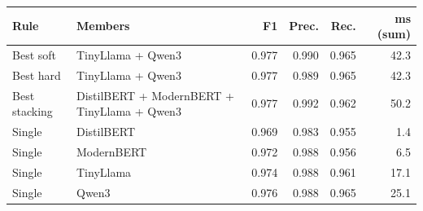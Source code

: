 \begin{tabular}{llrrrr}
\toprule
Rule & Members & F1 & Prec. & Rec. & ms (sum) \\
\midrule
Best soft & TinyLlama + Qwen3 & 0.977 & 0.990 & 0.965 & 42.3 \\
Best hard & TinyLlama + Qwen3 & 0.977 & 0.989 & 0.965 & 42.3 \\
Best stacking & DistilBERT + ModernBERT + TinyLlama + Qwen3 & 0.977 & 0.992 & 0.962 & 50.2 \\
\midrule Single & DistilBERT & 0.969 & 0.983 & 0.955 & 1.4 \\
Single & ModernBERT & 0.972 & 0.988 & 0.956 & 6.5 \\
Single & TinyLlama & 0.974 & 0.988 & 0.961 & 17.1 \\
Single & Qwen3 & 0.976 & 0.988 & 0.965 & 25.1 \\
\bottomrule
\end{tabular}
